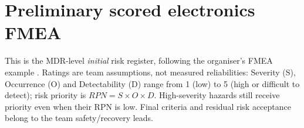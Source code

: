 
\section{Preliminary scored electronics FMEA}
\label{sec:fmea}
This is the MDR-level \emph{initial} risk register, following the organiser's FMEA example \cite{rtc2027app12}. Ratings are team assumptions, not measured reliabilities: Severity (S), Occurrence (O) and Detectability (D) range from 1 (low) to 5 (high or difficult to detect); risk priority is $RPN=S\times O\times D$. High-severity hazards still receive priority even when their RPN is low. Final criteria and residual risk acceptance belong to the team safety/recovery leads.

